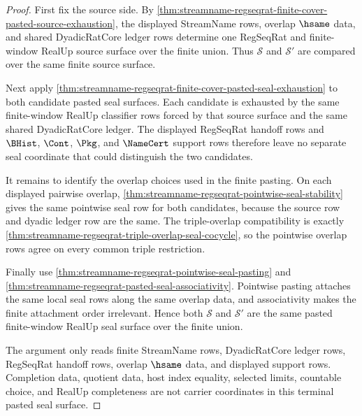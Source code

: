 \begin{proof}
First fix the source side. By
\autoref{thm:streamname-regseqrat-finite-cover-pasted-source-exhaustion}, the
displayed StreamName rows, overlap $\hsame$ data, and shared
DyadicRatCore ledger rows determine one RegSeqRat and finite-window RealUp
source surface over the finite union. Thus $\mathcal{S}$ and $\mathcal{S}'$
are compared over the same finite source surface.

Next apply
\autoref{thm:streamname-regseqrat-finite-cover-pasted-seal-exhaustion} to both
candidate pasted seal surfaces. Each candidate is exhausted by the same
finite-window RealUp classifier rows forced by that source surface and the
same shared DyadicRatCore ledger. The displayed RegSeqRat handoff rows and
$\BHist$, $\Cont$, $\Pkg$, and $\NameCert$ support rows therefore leave no
separate seal coordinate that could distinguish the two candidates.

It remains to identify the overlap choices used in the finite pasting. On each
displayed pairwise overlap,
\autoref{thm:streamname-regseqrat-pointwise-seal-stability} gives the same
pointwise seal row for both candidates, because the source row and dyadic
ledger row are the same. The triple-overlap compatibility is exactly
\autoref{thm:streamname-regseqrat-triple-overlap-seal-cocycle}, so the
pointwise overlap rows agree on every common triple restriction.

Finally use \autoref{thm:streamname-regseqrat-pointwise-seal-pasting} and
\autoref{thm:streamname-regseqrat-pasted-seal-associativity}. Pointwise
pasting attaches the same local seal rows along the same overlap data, and
associativity makes the finite attachment order irrelevant. Hence both
$\mathcal{S}$ and $\mathcal{S}'$ are the same pasted finite-window RealUp seal
surface over the finite union.

The argument only reads finite StreamName rows, DyadicRatCore ledger rows,
RegSeqRat handoff rows, overlap $\hsame$ data, and displayed support rows.
Completion data, quotient data, host index equality, selected limits,
countable choice, and RealUp completeness are not carrier coordinates in this
terminal pasted seal surface.
\end{proof}
